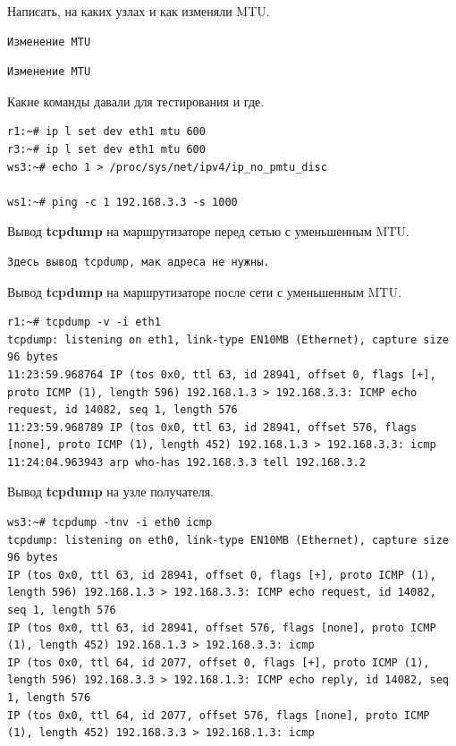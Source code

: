 \documentclass[a4paper,12pt]{article}
\begin{document}
Написать, на каких узлах и как изменяли MTU.


\begin{Verbatim}
Изменение MTU
\end{Verbatim}

\begin{Verbatim}
Изменение MTU
\end{Verbatim}


Какие команды давали для тестирования и где.

\begin{Verbatim}
r1:~# ip l set dev eth1 mtu 600
r3:~# ip l set dev eth1 mtu 600
ws3:~# echo 1 > /proc/sys/net/ipv4/ip_no_pmtu_disc

ws1:~# ping -c 1 192.168.3.3 -s 1000
\end{Verbatim}

Вывод \textbf{tcpdump} на маршрутизаторе перед сетью с уменьшенным MTU.


\begin{Verbatim}
Здесь вывод tcpdump, мак адреса не нужны.
\end{Verbatim}

Вывод \textbf{tcpdump} на маршрутизаторе после сети с уменьшенным MTU.


\begin{Verbatim}
r1:~# tcpdump -v -i eth1
tcpdump: listening on eth1, link-type EN10MB (Ethernet), capture size 96 bytes
11:23:59.968764 IP (tos 0x0, ttl 63, id 28941, offset 0, flags [+], proto ICMP (1), length 596) 192.168.1.3 > 192.168.3.3: ICMP echo request, id 14082, seq 1, length 576
11:23:59.968789 IP (tos 0x0, ttl 63, id 28941, offset 576, flags [none], proto ICMP (1), length 452) 192.168.1.3 > 192.168.3.3: icmp
11:24:04.963943 arp who-has 192.168.3.3 tell 192.168.3.2
\end{Verbatim}


Вывод \textbf{tcpdump} на узле получателя.

\begin{Verbatim}
ws3:~# tcpdump -tnv -i eth0 icmp
tcpdump: listening on eth0, link-type EN10MB (Ethernet), capture size 96 bytes
IP (tos 0x0, ttl 63, id 28941, offset 0, flags [+], proto ICMP (1), length 596) 192.168.1.3 > 192.168.3.3: ICMP echo request, id 14082, seq 1, length 576
IP (tos 0x0, ttl 63, id 28941, offset 576, flags [none], proto ICMP (1), length 452) 192.168.1.3 > 192.168.3.3: icmp
IP (tos 0x0, ttl 64, id 2077, offset 0, flags [+], proto ICMP (1), length 596) 192.168.3.3 > 192.168.1.3: ICMP echo reply, id 14082, seq 1, length 576
IP (tos 0x0, ttl 64, id 2077, offset 576, flags [none], proto ICMP (1), length 452) 192.168.3.3 > 192.168.1.3: icmp
\end{Verbatim}
\end{document}
